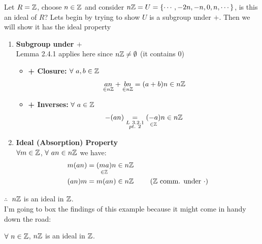 \begin{example}
    Let $R={\mathbb{ Z}}$, choose $n \in {\mathbb{ Z}}$ and consider $n{\mathbb{ Z}} = U = \{\cdots, -2n, -n, 0,n, \cdots\}$, is this an ideal of $R$? Lets begin by trying to show $U$ is a subgroup under $+$. Then we will show it has the ideal property
    \begin{enumerate}[label=\roman*)]
        \item \textbf{Subgroup under $+$} \\ Lemma 2.4.1 applies here since $n{\mathbb{ Z}} \neq \emptyset$ (it contains 0)
        \begin{itemize}
            \item \textbf{+ Closure:} $\forall \ a,b\in \Z$
            \begin{align}
                \underset{\in n{\mathbb{ Z}}}{an}+\underset{\in n{\mathbb{ Z}}}{bn} = (a+b)n \in n{\mathbb{ Z}} \nonumber
            \end{align}
            \item \textbf{+ Inverses:} $\forall \ a\in \Z$
            \begin{align}
                -(an) \underset{\substack{L\ 3.2.1\\pt.\ 2}}{=} \underset{\in {\mathbb{ Z}} }{(-a)}n \in n {\mathbb{ Z}} \nonumber
            \end{align}
        \end{itemize}
        \item \textbf{Ideal (Absorption) Property} \\ $\forall m \in {\mathbb{ Z}}$, $\forall \ an \in n{\mathbb{ Z}}$ we have:
        \begin{align}
            m(an)&=\underset{\in {\mathbb{ Z}}}{(ma)}n \in n {\mathbb{ Z}} \nonumber \\
            (an)m&=m(an) \in n {\mathbb{ Z}} \ \ \ \ \ \ \ ({\mathbb{ Z}} \text{ comm. under }\cdot)\nonumber
        \end{align}
    \end{enumerate}
    
    $\therefore \ $  $n{\mathbb{ Z}}$ is an ideal in ${\mathbb{ Z}}$.\\
     I'm going to box the findings of this example because it might come in handy down the road:
     \begin{tcolorbox}[width=2in, center=true]
\begin{center}
    $\forall \ n \in {\mathbb{ Z}}$, $n{\mathbb{ Z}}$ is an ideal in ${\mathbb{ Z}}$.
\end{center}
\end{tcolorbox}
\end{example}

